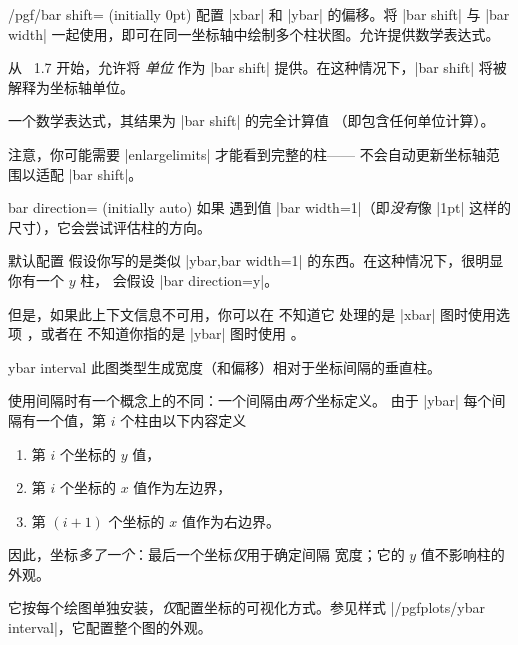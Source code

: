 {\begin{key}{/pgf/bar shift= (initially 0pt)}
    配置 |xbar| 和 |ybar| 的偏移。将 |bar shift| 与 |bar width|
    一起使用，即可在同一坐标轴中绘制多个柱状图。允许提供数学表达式。

    从 \PGFPlots{}~1.7 开始，允许将 \emph{单位} 作为 |bar shift|
    提供。在这种情况下，|bar shift| 将被解释为坐标轴单位。

    \begin{command}{\pgfplotbarshift}
        一个数学表达式，其结果为 |bar shift| 的完全计算值
        （即包含任何单位计算）。
    \end{command}

    注意，你可能需要 |enlargelimits| 才能看到完整的柱——\PGFPlots{}
    不会自动更新坐标轴范围以适配 |bar shift|。
\end{key}

\begin{pgfplotskey}{bar direction= (initially auto)}
    如果 \PGFPlots{} 遇到值 |bar width=1|（即\emph{没有}像 |1pt|
    这样的尺寸），它会尝试评估柱的方向。

    默认配置  假设你写的是类似 |ybar,bar width=1|
    的东西。在这种情况下，很明显你有一个 $y$ 柱，\PGFPlots{} 会假设
    |bar direction=y|。

    但是，如果此上下文信息不可用，你可以在 \PGFPlots{} 不知道它
    处理的是 |xbar| 图时使用选项 ，或者在 \PGFPlots{}
    不知道你指的是 |ybar| 图时使用 。
\end{pgfplotskey}

\begin{plottype}{ybar interval}
    此图类型生成宽度（和偏移）相对于坐标间隔的垂直柱。

    使用间隔时有一个概念上的不同：一个间隔由\emph{两个}坐标定义。
    由于 |ybar| 每个间隔有一个值，第 $i$ 个柱由以下内容定义
    \begin{enumerate}
        \item 第 $i$ 个坐标的 $y$ 值，
        \item 第 $i$ 个坐标的 $x$ 值作为左边界，
        \item 第 $(i+1)$ 个坐标的 $x$ 值作为右边界。
    \end{enumerate}
    因此，坐标\emph{多了一个}：最后一个坐标\emph{仅}用于确定间隔
    宽度；它的 $y$ 值不影响柱的外观。

    它按每个绘图单独安装，\emph{仅}配置坐标的可视化方式。参见样式
    |/pgfplots/ybar interval|，它配置整个图的外观。
\begin{codeexample}[]
\end{codeexample}


\end{plottype}}
